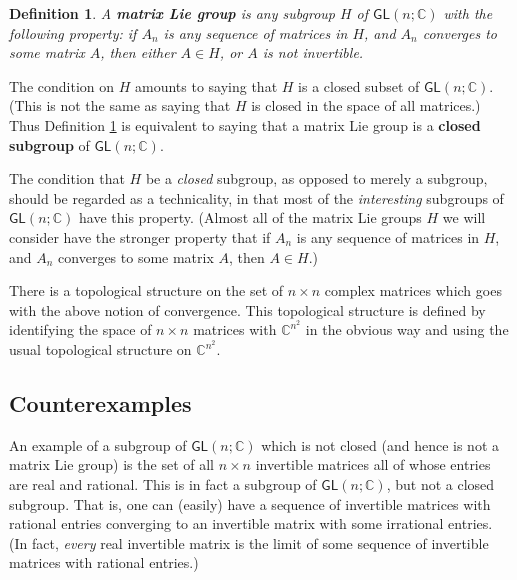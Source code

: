 \documentclass{amsbook}
\theoremstyle{plain}
\newtheorem{definition}[theorem]{Definition}
\numberwithin{equation}{chapter}
\numberwithin{theorem}{chapter}
\begin{document}
\begin{definition}
\label{matrix.group}A \textbf{matrix Lie group} is any subgroup $H$ of
$\mathsf{GL}(n;\mathbb{C})$ with the following property: if $A_{n}$ is any
sequence of matrices in $H$, and $A_{n}$ converges to some matrix $A$, then
either $A\in H$, or $A$ is not invertible.
\end{definition}

The condition on $H$ amounts to saying that $H$ is a closed subset of
$\mathsf{GL}(n;\mathbb{C})$. (This is not the same as saying that $H$ is
closed in the space of all matrices.) Thus Definition \ref{matrix.group} is
equivalent to saying that a matrix Lie group is a \textbf{closed subgroup} of
$\mathsf{GL}(n;\mathbb{C})$.

The condition that $H$ be a \textit{closed} subgroup, as opposed to merely a
subgroup, should be regarded as a technicality, in that most of the
\textit{interesting} subgroups of $\mathsf{GL}(n;\mathbb{C})$ have this
property. (Almost all of the matrix Lie groups $H$ we will consider have the
stronger property that if $A_{n}$ is any sequence of matrices in $H$, and
$A_{n}$ converges to some matrix $A$, then $A\in H$.)

There is a topological structure on the set of $n\times n$ complex matrices
which goes with the above notion of convergence. This topological structure is
defined by identifying the space of $n\times n$ matrices with $\mathbb{C}%
^{n^{2}}$ in the obvious way and using the usual topological structure on
$\mathbb{C}^{n^{2}}$.

\subsection{Counterexamples}

An example of a subgroup of $\mathsf{GL}(n;\mathbb{C})$ which is not closed
(and hence is not a matrix Lie group) is the set of all $n\times n$ invertible
matrices all of whose entries are real and rational. This is in fact a
subgroup of $\mathsf{GL}(n;\mathbb{C})$, but not a closed subgroup. That is,
one can (easily) have a sequence of invertible matrices with rational entries
converging to an invertible matrix with some irrational entries. (In fact,
\textit{every} real invertible matrix is the limit of some sequence of
invertible matrices with rational entries.)
\end{document}
